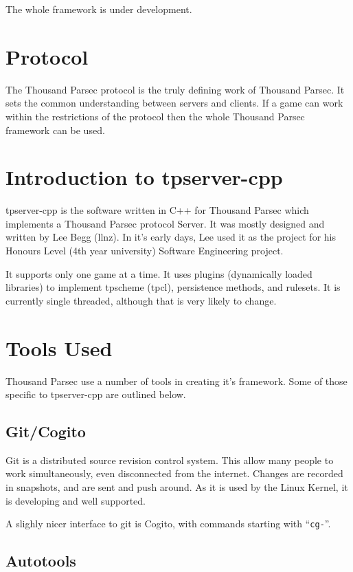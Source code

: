 \documentclass[a4paper,11pt]{report}
\begin{document}
The whole framework is under development.

\chapter{Protocol}
\label{chap:protocol-intro}

The Thousand Parsec protocol is the truly defining work of Thousand Parsec. It sets the common understanding between servers and clients. If a game can work within the restrictions of the protocol then the whole Thousand Parsec framework can be used.

\chapter{Introduction to tpserver-cpp}
\label{chap:tpserver-cpp-intro}
tpserver-cpp is the software written in C++ for Thousand Parsec which implements a Thousand Parsec protocol Server. It was mostly designed and written by Lee Begg (llnz). In it's early days, Lee used it as the project for his Honours Level (4th year university) Software Engineering project.

It supports only one game at a time. It uses plugins (dynamically loaded libraries) to implement tpscheme (tpcl), persistence methods, and rulesets. It is currently single threaded, although that is very likely to change.

\chapter{Tools Used}
\label{chap:tools}

Thousand Parsec use a number of tools in creating it's framework. Some of those specific to tpserver-cpp are outlined below.

\section{Git/Cogito}
\label{sec:git}

Git is a distributed source revision control system. This allow many people to work simultaneously, even disconnected from the internet. Changes are recorded in snapshots, and are sent and push around. As it is used by the Linux Kernel, it is developing and well supported.

A slighly nicer interface to git is Cogito, with commands starting with ``\texttt{cg-}''.

\section{Autotools}
\label{sec:autotools}
\end{document}
